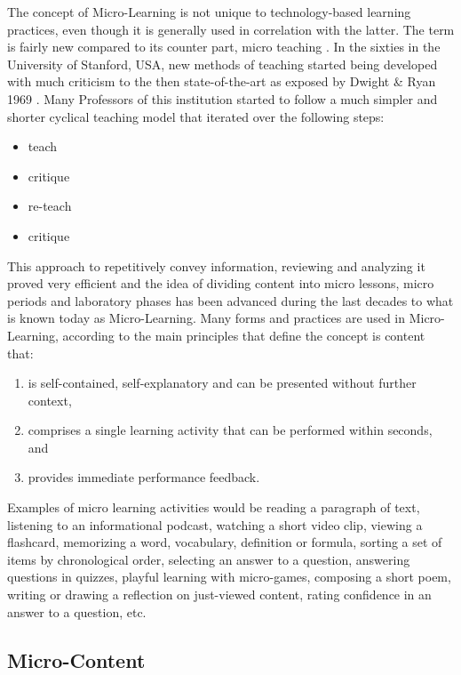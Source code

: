 The concept of Micro-Learning is not unique to technology-based learning practices,
even though it is generally used in correlation with the latter. The term is fairly
new compared to its counter part, micro teaching \cite{microlearningdimensions}. 
In the sixties in the University of Stanford, USA, new methods of teaching started 
being developed with much criticism to the then state-of-the-art as exposed by 
Dwight \& Ryan 1969 \cite{dwight_ryan_1969}. Many Professors of this institution started
to follow a much simpler and shorter cyclical teaching model that iterated over
the following steps:

\begin{itemize}
    \item teach
    \item critique
    \item re-teach
    \item critique
\end{itemize}

This approach to repetitively convey information, reviewing and analyzing it proved
very efficient and the idea of dividing content into micro lessons, micro periods and
laboratory phases has been advanced during the last decades to what is known today
as Micro-Learning. 
Many forms and practices are used in Micro-Learning, according to 
\cite{webservicearchitectureforsocialmicrolearning} the main 
principles that define the concept is content that:

\begin{enumerate}
    \item is self-contained, self-explanatory and can be presented without further context,
    \item comprises a single learning activity that can be performed within seconds, and
    \item provides immediate performance feedback.
\end{enumerate}


Examples of micro learning activities would be reading a paragraph of text, 
listening to an informational podcast, watching a short video clip, viewing a 
flashcard, memorizing a word, vocabulary, definition or formula, sorting a set
of items by chronological order, selecting an answer to a question, answering 
questions in quizzes, playful learning with micro-games, composing a short poem,
writing or drawing a reflection on just-viewed content, rating confidence in an 
answer to a question, etc.


\subsection{Micro-Content}

